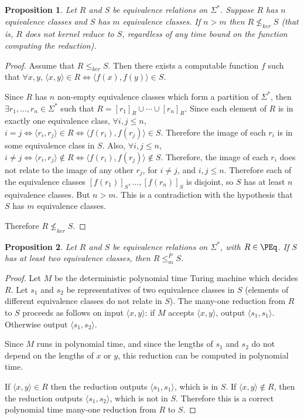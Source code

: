 \documentclass[draft]{article}
\newtheorem{proposition}[proposition]{Proposition}
\theoremstyle{definition} \newtheorem{openproblem}[openproblem]{Open problem}
\theoremstyle{definition} \newtheorem{definition}[definition]{Definition}
\theoremstyle{remark} \newtheorem{remark}[remark]{Remark}
\newcommand{\krnt}{\leq_{ker}} %
\newcommand{\nkrnt}{\nleq_{ker}} %
\newcommand{\mor}{\leq^{P}_{m}} %
\newcommand{\pair}[2]{\langle#1,#2\rangle} %
\begin{document}
\begin{proposition}\label{prop:noreduction}
  Let $R$ and $S$ be equivalence relations on $\Sigma^*$.
  Suppose $R$ has $n$ equivalence classes and $S$ has $m$ equivalence classes.
  If $n>m$ then $R\nkrnt S$ (that is, $R$ does not kernel reduce to $S$, regardless of any time bound on the function computing the reduction).
\end{proposition}
\begin{proof}
  Assume that $R\krnt S$.
  Then there exists a computable function $f$ such that $\forall x,y$, $\pair{x}{y}\in R\iff \pair{f(x)}{f(y)}\in S$.

  Since $R$ has $n$ non-empty equivalence classes which form a partition of $\Sigma^*$, then $\exists r_1,\ldots,r_n\in\Sigma^*$ such that $R=[r_1]_R\cup\cdots\cup[r_n]_R$.
  Since each element of $R$ is in exactly one equivalence class, $\forall i,j\leq n$, $i=j\iff\pair{r_i}{r_j}\in R\iff\pair{f(r_i)}{f(r_j)}\in S$.
  Therefore the image of each $r_i$ is in some equivalence class in $S$.
  Also, $\forall i,j\leq n$, $i\neq j\iff \pair{r_i}{r_j}\notin R\iff \pair{f(r_i)}{f(r_j)}\notin S$.
  Therefore, the image of each $r_i$ does not relate to the image of any other $r_j$, for $i\neq j$, and $i,j\leq n$.
  Therefore each of the equivalence classes $[f(r_1)]_S,\ldots,[f(r_n)]_S$ is disjoint, so $S$ has at least $n$ equivalence classes.
  But $n>m$.
  This is a contradiction with the hypothesis that $S$ has $m$ equivalence classes.

  Therefore $R\nkrnt S$.
\end{proof}

\begin{proposition}\label{prop:tworeduction}
  Let $R$ and $S$ be equivalence relations on $\Sigma^*$, with $R\in\PEq$.
  If $S$ has at least two equivalence classes, then $R\mor S$.
\end{proposition}
\begin{proof}
  Let $M$ be the deterministic polynomial time Turing machine which decides $R$.
  Let $s_1$ and $s_2$ be representatives of two equivalence classes in $S$ (elements of different equivalence classes do not relate in $S$).
  The many-one reduction from $R$ to $S$ proceeds as follows on input $\pair{x}{y}$: if $M$ accepts $\pair{x}{y}$, output $\pair{s_1}{s_1}$.
  Otherwise output $\pair{s_1}{s_2}$.

  Since $M$ runs in polynomial time, and since the lengths of $s_1$ and $s_2$ do not depend on the lengths of $x$ or $y$, this reduction can be computed in polynomial time.

  If $\pair{x}{y}\in R$ then the reduction outputs $\pair{s_1}{s_1}$, which is in $S$.
  If $\pair{x}{y}\notin R$, then the reduction outputs $\pair{s_1}{s_2}$, which is not in $S$.
  Therefore this is a correct polynomial time many-one reduction from $R$ to $S$.
\end{proof}
\end{document}
